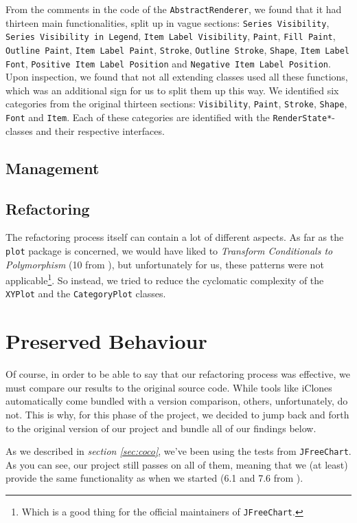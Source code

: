 \documentclass[11pt]{article}
\begin{document}
	From the comments in the code of the \texttt{AbstractRenderer}, we found that it had thirteen main functionalities, split up in vague sections: \texttt{Series Visibility}, \texttt{Series Visibility in Legend}, \texttt{Item Label Visibility}, \texttt{Paint}, \texttt{Fill Paint}, \texttt{Outline Paint}, \texttt{Item Label Paint}, \texttt{Stroke}, \texttt{Outline Stroke}, \texttt{Shape}, \texttt{Item Label Font}, \texttt{Positive Item Label Position} and \texttt{Negative Item Label Position}. Upon inspection, we found that not all extending classes used all these functions, which was an additional sign for us to split them up this way. We identified six categories from the original thirteen sections: \texttt{Visibility}, \texttt{Paint}, \texttt{Stroke}, \texttt{Shape}, \texttt{Font} and \texttt{Item}. Each of these categories are identified with the \texttt{RenderState*}-classes and their respective interfaces.
	
	\subsection{Management}
	\subsection{Refactoring}
	The refactoring process itself can contain a lot of different aspects. As far as the \texttt{plot} package is concerned, we would have liked to \textsl{Transform Conditionals to Polymorphism} (10 from \cite{demeyer2009object}), but unfortunately for us, these patterns were not applicable\footnote{Which is a good thing for the official maintainers of \texttt{JFreeChart}.}. So instead, we tried to reduce the cyclomatic complexity of the \texttt{XYPlot} and the \texttt{CategoryPlot} classes.
	
	\section{Preserved Behaviour}
	\label{sec:pb}
	Of course, in order to be able to say that our refactoring process was effective, we must compare our results to the original source code. While tools like \textsf{iClones} \cite{iclones} automatically come bundled with a version comparison, others, unfortunately, do not. This is why, for this phase of the project, we decided to jump back and forth to the original version of our project and bundle all of our findings below.
	
	As we described in \textsl{section \ref{sec:coco}}, we've been using the tests from \texttt{JFreeChart}. As you can see, our project still passes on all of them, meaning that we (at least) provide the same functionality as when we started (6.1 and 7.6 from \cite{demeyer2009object}).
	
\end{document}
